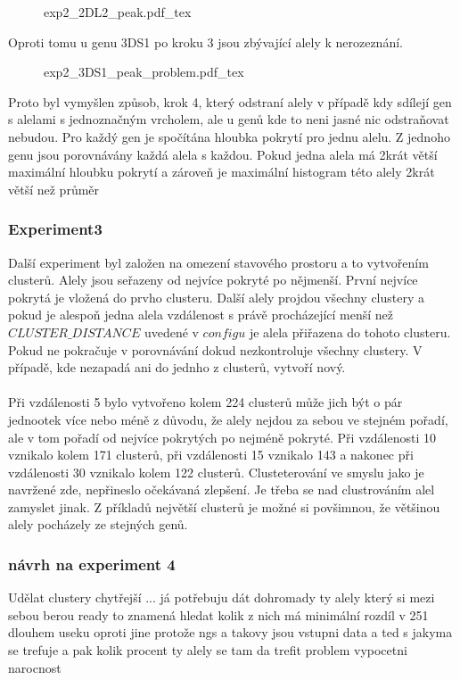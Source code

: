 \documentclass[czech,DP]{thesiskiv}
\numberwithin{equation}{section}
\begin{document}
\begin{figure}[H]
	\centering
    \def\svgwidth{\columnwidth}
    {exp2_2DL2_peak.pdf_tex} 
\end{figure}

\noindent 
Oproti tomu u genu 3DS1 po kroku 3 jsou zbývající alely k nerozeznání. 

\begin{figure}[H]
	\centering
    \def\svgwidth{\columnwidth}
    {exp2_3DS1_peak_problem.pdf_tex} 
\end{figure}

\noindent
Proto byl vymyšlen způsob, krok 4, který odstraní alely v případě kdy sdílejí gen s alelami s jednoznačným vrcholem, ale u genů kde to neni jasné nic odstraňovat nebudou. Pro každý gen je spočítána hloubka pokrytí pro jednu alelu. Z jednoho genu jsou porovnávány každá alela s každou. Pokud jedna alela má 2krát větší maximální hloubku pokrytí a zároveň je maximální histogram této alely 2krát větší než průměr  
 

\subsubsection{Experiment3}
Další experiment byl založen na omezení stavového prostoru a to vytvořením clusterů. Alely jsou seřazeny od nejvíce pokryté po nějmenší. První nejvíce pokrytá je vložená do prvho clusteru. Další alely projdou všechny clustery a pokud je alespoň jedna alela vzdálenost s právě procházející menší než $CLUSTER\_DISTANCE$ uvedené v $configu$ je alela přiřazena do tohoto clusteru. Pokud ne pokračuje v porovnávání dokud nezkontroluje všechny clustery. V případě, kde nezapadá ani do jednho z clusterů, vytvoří nový.
\\
\\
Při vzdálenosti 5 bylo vytvořeno kolem 224 clusterů může jich být o pár jednootek více nebo méně z důvodu, že alely nejdou za sebou ve stejném pořadí, ale v tom pořadí od nejvíce pokrytých po nejméně pokryté. Při vzdálenosti 10 vznikalo kolem 171 clusterů, při vzdálenosti 15 vznikalo 143 a nakonec při vzdálenosti 30 vznikalo kolem 122 clusterů. Clusteterování ve smyslu jako je navržené zde, nepřineslo očekávaná zlepšení. Je třeba se nad clustrováním alel zamyslet jinak. Z příkladů největší clusterů je možné si povšimnou, že většinou alely pocházely ze stejných genů.


\subsubsection{návrh na experiment 4}
Udělat clustery chytřejší ...
já potřebuju dát dohromady ty alely který si mezi sebou berou ready to znamená hledat kolik z nich má minimální rozdíl v 251 dlouhem useku oproti jine protože ngs a takovy jsou vstupni data
a ted s jakyma se trefuje a pak kolik procent ty alely se tam da trefit 
problem vypocetni narocnost
\end{document}
